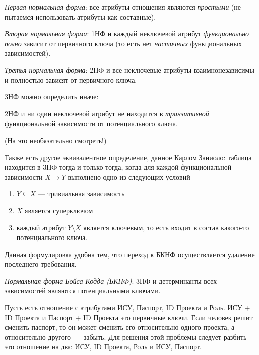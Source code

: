 \begin{definition}[1НФ]
  \textit{Первая нормальная форма}: все атрибуты отношения являются \textit{простыми} 
  (не пытаемся использовать атрибуты как составные).
\end{definition}

\begin{definition}[2НФ]
  \textit{Вторая нормальная форма}: 1НФ и каждый неключевой атрибут 
  \textit{функционально полно} зависит от первичного ключа
  (то есть нет \textit{частичных} функциональных зависимостей).
\end{definition}

\begin{definition}[3НФ]
  \textit{Третья нормальная форма}: 2НФ и все неключевые атрибуты взаимнонезависимы и
  полностью зависят от первичного ключа.
\end{definition}

3НФ можно определить иначе:
\begin{definition}[3НФ]
  2НФ и ни один неключевой атрибут не находится в \textit{транзитивной} функциональной
  зависимости от потенциального ключа.
\end{definition}

\begin{remark}
  (На это необязательно смотреть!)

  Также есть другое эквивалентное определение, данное Карлом Заниоло:
  таблица находится в 3НФ тогда и только тогда, когда для каждой функциональной зависимости
  \(X \to Y\) выполнено одно из следующих условий
  \begin{enumerate}
    \item \(Y \subseteq X\) --- тривиальная зависимость
    \item \(X\) является суперключом
    \item каждый атрибут \(Y \setminus X\) является ключевым,
    то есть входит в состав какого-то потенциального ключа.
  \end{enumerate}

  Данная формулировка удобна тем, что переход к БКНФ осуществляется удаление последнего требования.
\end{remark}

\begin{definition}[БКНФ]
  \textit{Нормальная форма Бойса-Кодда (БКНФ)}: 3НФ и детерминанты всех зависимостей
  являются потенциальными ключами.
\end{definition}

\begin{example}
  Пусть есть отношение с атрибутами ИСУ, Паспорт, ID Проекта и Роль. ИСУ +
   ID Проекта и Паспорт + ID Проекта это первичные ключи. Если человек решит
   сменить паспорт, то он может сменить его относительно одного проекта, а
   относительно другого~--- забыть. Для решения этой проблемы следует разбить
   это отношение на два: ИСУ, ID Проекта, Роль и ИСУ, Паспорт.
\end{example}

